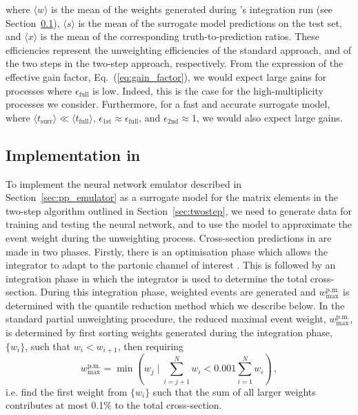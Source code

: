 \documentclass[main.tex]{subfiles}
\begin{document}
where $\langle w \rangle$ is the mean of the weights generated during {\Sherpa}'s
integration run (see Section~\ref{sec:fame_sherpa}),
$\langle s \rangle$ is the mean of the surrogate model predictions
on the test set, and $\langle x \rangle$ is the mean of the corresponding truth-to-prediction ratios.
These efficiencies represent the unweighting efficiencies of the standard
approach, and of the two steps in the two-step approach, respectively.
From the expression of the effective gain factor, Eq.~(\ref{eq:gain_factor}),
we would expect large gains for processes where $\epsilon_{\mathrm{full}}$ is low.
Indeed, this is the case for the high-multiplicity processes we consider. Furthermore,
for a fast and accurate surrogate model, where
$\langle t_{\mathrm{surr}} \rangle \ll \langle t_{\mathrm{full}} \rangle$,
$\epsilon_{\mathrm{1st}} \approx \epsilon_{\mathrm{full}}$, and
$\epsilon_{\mathrm{2nd}} \approx 1$, we would also expect large gains.

\subsection{Implementation in {\Sherpa}}\label{sec:fame_sherpa}
To implement the neural network emulator described in Section~\ref{sec:pp_emulator}
as a surrogate model for the matrix elements in the two-step algorithm
outlined in Section~\ref{sec:twostep},
we need to generate data for training and testing the neural network,
and to use the model to approximate the event weight during the unweighting
process.
Cross-section predictions in {\Sherpa} are made in two phases.
Firstly, there is an optimisation phase which allows the integrator to adapt
to the partonic channel of interest \cite{Kleiss:1994qy}. This is followed by an integration
phase in which the integrator is used to determine the total cross-section.
During this integration phase, weighted events are generated and $w_{\mathrm{max}}^{\mathrm{p.m.}}$
is determined with the quantile reduction method which we describe below.
In the standard partial unweighting procedure, the reduced maximal event weight,
$w_{\mathrm{max}}^{\mathrm{p.m.}}$, is determined by first sorting weights
generated during the integration phase, $\{w_{i}\}$, such that $w_{i} < w_{i+1}$, then requiring
\begin{equation}
    w_{\mathrm{max}}^{\mathrm{p.m.}} = \min\left(w_{j} \; \Bigg| \; \sum_{i=j+1}^{N} w_{i} < 0.001 \sum_{i=1}^{N} w_{i} \right) \, ,
    \label{eq:w_max}
\end{equation}
i.e. find the first weight from $\{w_{i}\}$ such that the sum of all larger weights
contributes at most 0.1\% to the total cross-section.
\end{document}
